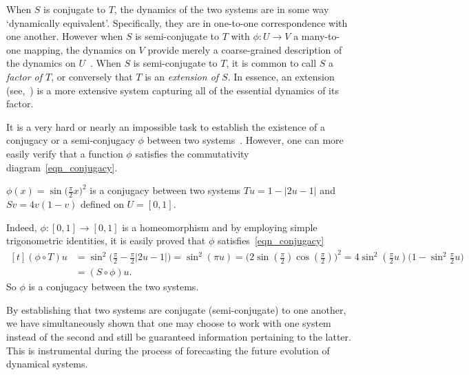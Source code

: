 When $S$ is conjugate to $T$, the dynamics of the two systems are in some way `dynamically equivalent'. Specifically, they are in one-to-one correspondence with one another. However when $S$ is semi-conjugate to $T$ with $\phi:U\to{V}$ a many-to-one mapping, the dynamics on $V$ provide merely a coarse-grained description of the dynamics on $U$~\cite{de2013elements}. When $S$ is semi-conjugate to $T$, it is common to call $S$ a \emph{factor of $T$}, or conversely that $T$ is an \emph{extension of $S$}. In essence, an extension (see,~\cite{de2013elements}) is a more extensive system capturing all of the essential dynamics of its factor.

It is a very hard or nearly an impossible task to establish the existence of a conjugacy or a semi-conjugacy $\phi$ between two systems~\cite{devaney2018introduction}. However, one can more easily verify that a function $\phi$ satisfies the commutativity diagram~\ref{eqn_conjugacy}.  

\begin{Example}\rm
  $\phi(x)=\sin{\big(\frac{\pi}{2}x\big)}^2$ is a conjugacy between two systems $Tu=1-|2u-1|$ and $Sv=4v(1-v)$  defined on $U=[0,1]$.  

  Indeed, $\phi:[0,1]\to[0,1]$ is a homeomorphism and by employing simple trigonometric identities, it is easily proved that $\phi$ satisfies~\ref{eqn_conjugacy}
  \[
    \begin{aligned}[t]
      (\phi\circ{T})u 
                &=\sin^{2}\Big(\frac{\pi}{2} - \frac{\pi}{2}|2u-1|\Big) = \sin^{2}(\pi{u})={\Big(2\sin(\frac{\pi}{2})\cos(\frac{\pi}{2})\Big)}^{2}=4\sin^{2}(\frac{\pi}{2}u)\Big(1-\sin^{2}\frac{\pi}{2}u\Big) \\
                                    &=({S}\circ\phi)u.
    \end{aligned}
\]
So $\phi$ is a conjugacy between the two systems.
\end{Example}


By establishing that two systems are conjugate (semi-conjugate) to one another, we have simultaneously shown that one may choose to work with one system instead of the second and still be guaranteed information pertaining to the latter. This is instrumental during the process of forecasting the future evolution of dynamical systems. 

